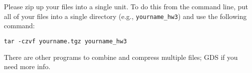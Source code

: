 \documentclass[12pt, letterpaper]{article}
\begin{document}
Please zip up your files into a single unit.  To do this from the command line,
put all of your files into a single directory (e.g., {\tt yourname\_hw3}) and
use the following command:
\begin{verbatim}
tar -czvf yourname.tgz yourname_hw3
\end{verbatim}
There are other programs to combine and compress multiple files; GDS if you
need more info.
\end{document}
